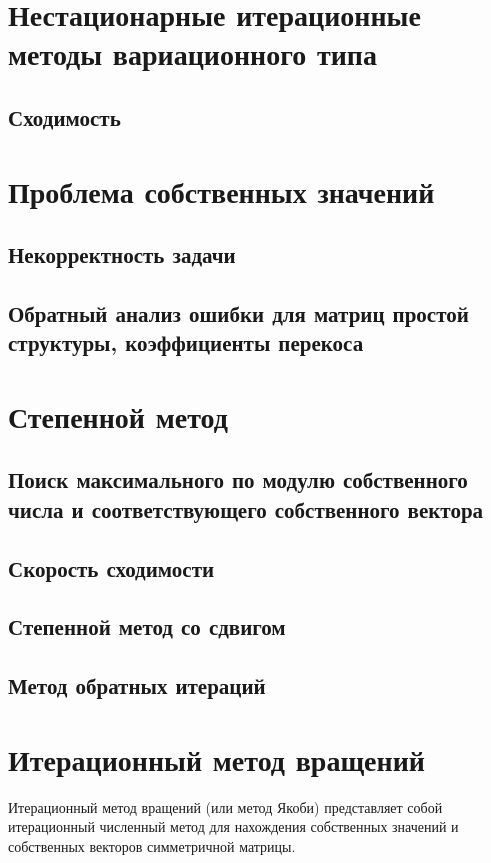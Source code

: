 \documentclass{article}
\begin{document}
\section{Нестационарные итерационные методы вариационного типа}

\subsection{Сходимость}

\section{Проблема собственных значений}

\subsection{Некорректность задачи}
\subsection{Обратный анализ ошибки для матриц простой структуры, коэффициенты перекоса}

\section{Степенной метод}

\subsection{Поиск максимального по модулю собственного числа и соответствующего собственного вектора}
\subsection{Скорость сходимости}
\subsection{Степенной метод со сдвигом}
\subsection{Метод обратных итераций}

\section{Итерационный метод вращений}

Итерационный метод вращений (или метод Якоби) представляет собой итерационный численный метод для нахождения собственных значений и собственных векторов симметричной матрицы.
\end{document}
